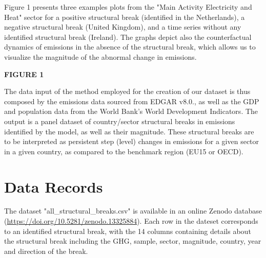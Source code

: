 \documentclass[a4paper]{article}
\begin{document}
Figure 1 presents three examples plots from the "Main Activity Electricity and Heat" sector for a positive structural break (identified in the Netherlands), a negative structural break (United Kingdom), and a time series without any identified structural break (Ireland). The graphs depict also the counterfactual dynamics of emissions in the absence of the structural break, which allows us to visualize the magnitude of the abnormal change in emissions.

\bigskip
\begin{center}
    \textbf{FIGURE 1}
\end{center}

The data input of the method employed for the creation of our dataset is thus composed by the emissions data sourced from EDGAR v8.0., as well as the GDP and population data from the World Bank's World Development Indicators. The output is a panel dataset of country/sector structural breaks in emissions identified by the model, as well as their magnitude. These structural breaks are to be interpreted as persistent step (level) changes in emissions for a given sector in a given country, as compared to the benchmark region (EU15 or OECD).



\section*{Data Records}

The dataset "all\_structural\_breaks.csv" is available in an online Zenodo database (\url{https://doi.org/10.5281/zenodo.13325884}). \cite{breaks_database} Each row in the dateset corresponds to an identified structural break, with the 14 columns containing details about the structural break including the GHG, sample, sector, magnitude, country, year and direction of the break.
\end{document}
